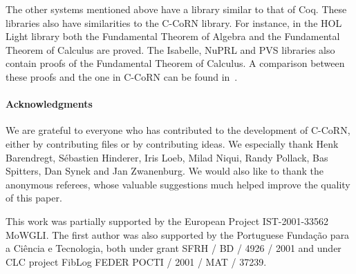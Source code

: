 \documentclass[runningheads]{llncs}
\newcommand{\ccorn}{\mbox{C-CoRN}}
\newcommand{\weg}[1]{}
\begin{document}
The other systems mentioned above have a library similar to
that of Coq.
These libraries also have similarities to the {\ccorn} library.
For instance, in the HOL Light library both the Fundamental
Theorem of Algebra and the Fundamental Theorem of Calculus
are proved.
The Isabelle, NuPRL and PVS libraries also contain proofs of the
Fundamental Theorem of Calculus.
A comparison between these proofs and the one in {\ccorn} can
be found in~\cite{cfilipe2002}.

\weg{Of course the {\ccorn} repository is the most serious constructive
library available today.}

\paragraph{Acknowledgments}

We are grateful to everyone who has 
contributed to the development of \ccorn, either by contributing files
or by contributing ideas. We especially
thank Henk Barendregt, S\'ebastien Hinderer, Iris Loeb, Milad Niqui,
Randy Pollack, Bas Spitters, Dan Synek and Jan Zwanenburg.
We would also like to thank the anonymous referees, whose valuable
suggestions much helped improve the quality of this paper.

This work was partially supported by the European Project 
IST-2001-33562 MoWGLI.
The first author was also supported by the Portuguese
Fun\-da\-\c c\~ao pa\-ra a Ci\^en\-cia e Tec\-no\-lo\-gia, both under grant
SFRH / BD / 4926 / 2001 and under CLC project FibLog FEDER
POCTI / 2001 / MAT / 37239.



\end{document}

